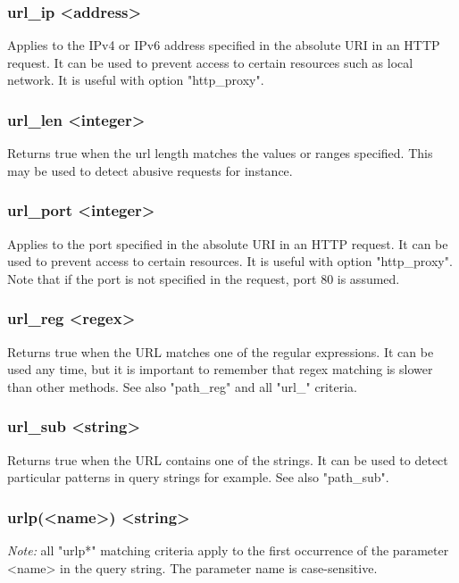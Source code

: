 \subsubsection[url\_ip]{url\_ip <address>}
  Applies to the IPv4 or IPv6 address specified in the absolute URI in an HTTP
  request. It can be used to prevent access to certain resources such as local
  network. It is useful with option "http\_proxy".

\subsubsection[url\_len]{url\_len <integer>}
  Returns true when the url length matches the values or ranges specified. This
  may be used to detect abusive requests for instance.

\subsubsection[url\_port]{url\_port <integer>}
  Applies to the port specified in the absolute URI in an HTTP request. It can
  be used to prevent access to certain resources. It is useful with option
  "http\_proxy". Note that if the port is not specified in the request, port 80
  is assumed.

\subsubsection[url\_reg]{url\_reg <regex>}
  Returns true when the URL matches one of the regular expressions. It can be
  used any time, but it is important to remember that regex matching is slower
  than other methods. See also "path\_reg" and all "url\_" criteria.

\subsubsection[url\_sub]{url\_sub <string>}
  Returns true when the URL contains one of the strings. It can be used to
  detect particular patterns in query strings for example. See also "path\_sub".

\subsubsection[urlp]{urlp(<name>) <string>}
  \emph{Note:} all "urlp*" matching criteria apply to the first occurrence of the
  parameter <name> in the query string. The parameter name is case-sensitive.

